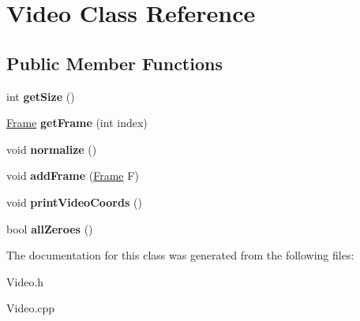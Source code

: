 \hypertarget{classVideo}{}\section{Video Class Reference}
\label{classVideo}
\subsection*{Public Member Functions}
\begin{DoxyCompactItemize}
\item 
\hypertarget{classVideo_a9b9bd88f22c4ccdbd94333e6d63a6a6a}{}int {\bfseries get\+Size} ()\label{classVideo_a9b9bd88f22c4ccdbd94333e6d63a6a6a}

\item 
\hypertarget{classVideo_a8d90ad1eb16f3812afc53141b8b2f4d4}{}\hyperlink{classFrame}{Frame} {\bfseries get\+Frame} (int index)\label{classVideo_a8d90ad1eb16f3812afc53141b8b2f4d4}

\item 
\hypertarget{classVideo_abd24f94a8352bb928d70f983bc24a71e}{}void {\bfseries normalize} ()\label{classVideo_abd24f94a8352bb928d70f983bc24a71e}

\item 
\hypertarget{classVideo_ab31355a14c3dd935893722e591d0bed3}{}void {\bfseries add\+Frame} (\hyperlink{classFrame}{Frame} F)\label{classVideo_ab31355a14c3dd935893722e591d0bed3}

\item 
\hypertarget{classVideo_a06d4db112518e93715638d4ded34e79a}{}void {\bfseries print\+Video\+Coords} ()\label{classVideo_a06d4db112518e93715638d4ded34e79a}

\item 
\hypertarget{classVideo_a56f7d1a37a0c7dce9c28586978d49fe9}{}bool {\bfseries all\+Zeroes} ()\label{classVideo_a56f7d1a37a0c7dce9c28586978d49fe9}

\end{DoxyCompactItemize}


The documentation for this class was generated from the following files\+:\begin{DoxyCompactItemize}
\item 
Video.\+h\item 
Video.\+cpp\end{DoxyCompactItemize}
